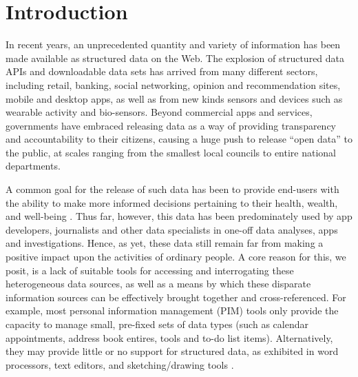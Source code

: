 \documentclass{sigchi}
\begin{document}



\section{Introduction}
In recent years, an unprecedented quantity and variety of information has been made available as structured data on the Web.  The explosion of structured data APIs and downloadable data sets has arrived from many different sectors, including retail, banking, social networking, opinion and recommendation sites, mobile and desktop apps, as well as from new kinds sensors and devices such as wearable activity and bio-sensors. Beyond commercial apps and services, governments have embraced releasing data as a way of providing transparency and accountability to their citizens, causing a huge push to release ``open data'' to the public, at scales ranging from the smallest local councils to entire national departments.  

A common goal for the release of such data has been to provide end-users with the ability to make more informed decisions pertaining to their health, wealth, and well-being \cite{Shadbolt:2006:SWR:1155313.1155373}.  Thus far, however, this data has been predominately used by app developers, journalists and other data specialists in one-off data analyses, apps and investigations.  Hence, as yet, these data still remain far from making a positive impact upon the activities of ordinary people. A core reason for this, we posit, is a lack of suitable tools for accessing and interrogating these heterogeneous data sources, as well as a means by which these disparate information sources can be effectively brought together and cross-referenced.  For example, most personal information management (PIM) tools only provide the capacity to manage small, pre-fixed sets of data types (such as calendar appointments, address book entires,  tools and to-do list items).  Alternatively, they may provide little or no support for structured data, as exhibited in word processors, text editors, and sketching/drawing tools \cite{infoscraps}.   
\end{document}
